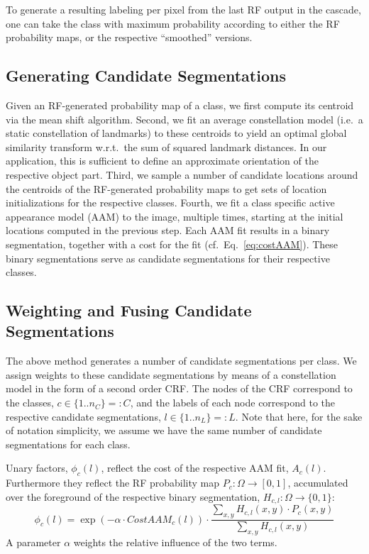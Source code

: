 \documentclass[10pt,twocolumn,letterpaper]{article}
\begin{document}
To generate a resulting labeling per pixel from the last RF output in the cascade, one can take the class with maximum probability according to either the RF probability maps, or the respective ``smoothed'' versions. 


\subsection{Generating Candidate Segmentations}
\label{subsec:hyps}
%
Given an RF-generated probability map of a class, we
first compute its centroid via the mean shift algorithm. 
%
Second, we fit an average constellation model (i.e.\ a static constellation of landmarks) to these centroids to yield an optimal global similarity transform w.r.t.\ the sum of squared landmark distances. In our application, this is sufficient to define an approximate orientation of the respective object part. 
%
Third, we sample a number of candidate locations around the centroids of the RF-generated probability maps to get sets of location initializations for the respective classes. 
%
Fourth, we fit a class specific active appearance model (AAM) to the image, multiple times, starting at the initial locations computed in the previous step. 
%
Each AAM fit results in a binary segmentation, together with a cost for the fit (cf.\ Eq.\ \eqref{eq:costAAM}). 
%
These binary segmentations serve as candidate segmentations for their respective classes. 

\subsection{Weighting and Fusing Candidate Segmentations}
\label{subsec:weightsAndFusion}

The above method generates a number of candidate segmentations per class. 
%
We assign weights to these candidate segmentations by means of a constellation model in the form of a second order CRF. 
%
The nodes of the CRF correspond to the classes, $c\in \{1..n_C\}=:C$, and the labels of each node correspond to the respective candidate segmentations, $l\in \{1..n_L\}=:L$. 
Note that here, for the sake of notation simplicity, we assume we have the same number of candidate segmentations for each class. 

Unary factors, $\phi_c(l)$, reflect the cost of the respective AAM fit, $A_c(l)$. Furthermore they reflect the RF probability map $P_c:\Omega\rightarrow [ 0,1 ]$, accumulated over the foreground of the respective binary segmentation, $H_{c,l}: \Omega\rightarrow \{0,1\}$: 
\begin{equation}
\phi_c(l) = \exp{(-\alpha\cdot CostAAM_c(l))} \cdot \frac{\sum_{x,y} H_{c,l}(x,y)\cdot P_c(x,y)}{\sum_{x,y} H_{c,l}(x,y)}
\label{eq:unaries}
\end{equation}
A parameter $\alpha$ weights the relative influence of the two terms. 
\end{document}

